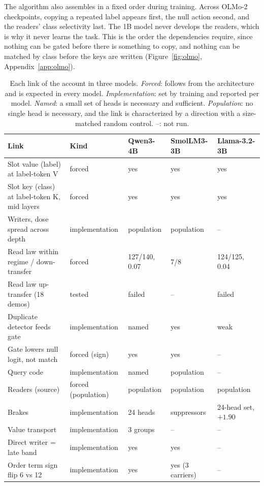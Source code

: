 \documentclass{article}
\begin{document}
The algorithm also assembles in a fixed order during training. Across OLMo-2 checkpoints, copying a repeated label appears first, the null action second, and the readers' class selectivity last. The 1B model never develops the readers, which is why it never learns the task. This is the order the dependencies require, since nothing can be gated before there is something to copy, and nothing can be matched by class before the keys are written (Figure~\ref{fig:olmo}, Appendix~\ref{app:olmo}).

\begin{table}[t]\centering\small
\caption{Each link of the account in three models. \emph{Forced}: follows from the architecture and is expected in every model. \emph{Implementation}: set by training and reported per model. \emph{Named}: a small set of heads is necessary and sufficient. \emph{Population}: no single head is necessary, and the link is characterized by a direction with a size-matched random control. --: not run.}
\label{tab:replication}
\begin{tabularx}{\linewidth}{Yllll}
\toprule
Link & Kind & Qwen3-4B & SmolLM3-3B & Llama-3.2-3B \\
\midrule
Slot value (label) at label-token V & forced & yes & yes & yes \\
Slot key (class) at label-token K, mid layers & forced & yes & yes & yes \\
Writers, dose spread across depth & implementation & population & population & -- \\
Read law within regime / down-transfer & forced & 127/140, 0.07 & 7/8 & 124/125, 0.04 \\
Read law up-transfer (18 demos) & tested & failed & -- & failed \\
Duplicate detector feeds gate & implementation & named & yes & weak \\
Gate lowers null logit, not match & forced (sign) & yes & yes & -- \\
Query code & implementation & named & population & -- \\
Readers (source) & forced (population) & population & population & population \\
Brakes & implementation & 24 heads & suppressors & 24-head set, $+1.90$ \\
Value transport & implementation & 3 groups & -- & -- \\
Direct writer = late band & implementation & yes & yes & -- \\
Order term sign flip 6 vs 12 & implementation & yes & yes (3 carriers) & -- \\
\bottomrule
\end{tabularx}
\end{table}
\end{document}
